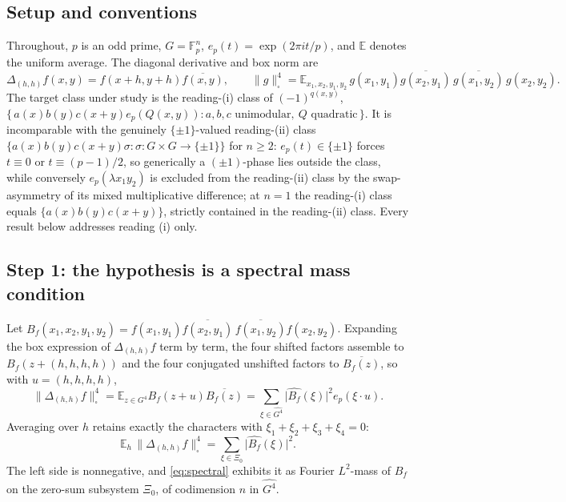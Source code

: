 \documentclass[11pt]{article}
\begin{document}
\subsection{Setup and conventions}
Throughout, $p$ is an odd prime, $G=\mathbb{F}_p^n$, $e_p(t)=\exp(2\pi i t/p)$,
and $\mathbb{E}$ denotes the uniform average. The diagonal derivative and box
norm are
\[
\Delta_{(h,h)}f(x,y)=f(x+h,y+h)\overline{f(x,y)},\qquad
\|g\|_\square^4=\mathbb{E}_{x_1,x_2,y_1,y_2}\,
g(x_1,y_1)\overline{g(x_2,y_1)}\,\overline{g(x_1,y_2)}\,g(x_2,y_2).
\]
The target class under study is the reading-(i) class of $(-1)^{q(x,y)}$,
$\{\,a(x)b(y)c(x+y)e_p(Q(x,y)) : a,b,c \text{ unimodular},\ Q \text{ quadratic}\,\}$.
It is incomparable with the genuinely $\{\pm1\}$-valued reading-(ii) class
$\{a(x)b(y)c(x+y)\sigma : \sigma:G\times G\to\{\pm1\}\}$ for $n\ge2$:
$e_p(t)\in\{\pm1\}$ forces $t\equiv0$ or $t\equiv(p-1)/2$, so generically a
$(\pm1)$-phase lies outside the class, while conversely $e_p(\lambda x_1y_2)$
is excluded from the reading-(ii) class by the swap-asymmetry of its mixed
multiplicative difference; at $n=1$ the reading-(i) class equals
$\{a(x)b(y)c(x+y)\}$, strictly contained in the reading-(ii) class. Every
result below addresses reading (i) only.

\subsection{Step 1: the hypothesis is a spectral mass condition}
Let $B_f(x_1,x_2,y_1,y_2)=f(x_1,y_1)\overline{f(x_2,y_1)}\,
\overline{f(x_1,y_2)}f(x_2,y_2)$. Expanding the box expression of
$\Delta_{(h,h)}f$ term by term, the four shifted factors assemble to
$B_f(z+(h,h,h,h))$ and the four conjugated unshifted factors to
$\overline{B_f(z)}$, so with $u=(h,h,h,h)$,
\[
\|\Delta_{(h,h)}f\|_\square^4=\mathbb{E}_{z\in G^4}B_f(z+u)\overline{B_f(z)}
=\sum_{\xi\in\widehat{G^4}}\bigl|\widehat{B_f}(\xi)\bigr|^2 e_p(\xi\cdot u).
\]
Averaging over $h$ retains exactly the characters with
$\xi_1+\xi_2+\xi_3+\xi_4=0$:
\begin{equation}\label{eq:spectral}
\mathbb{E}_h\,\|\Delta_{(h,h)}f\|_\square^4
=\sum_{\xi\in\Xi_0}\bigl|\widehat{B_f}(\xi)\bigr|^2 .
\end{equation}
The left side is nonnegative, and \eqref{eq:spectral} exhibits it as Fourier
$L^2$-mass of $B_f$ on the zero-sum subsystem $\Xi_0$, of codimension $n$ in
$\widehat{G^4}$.
\end{document}
